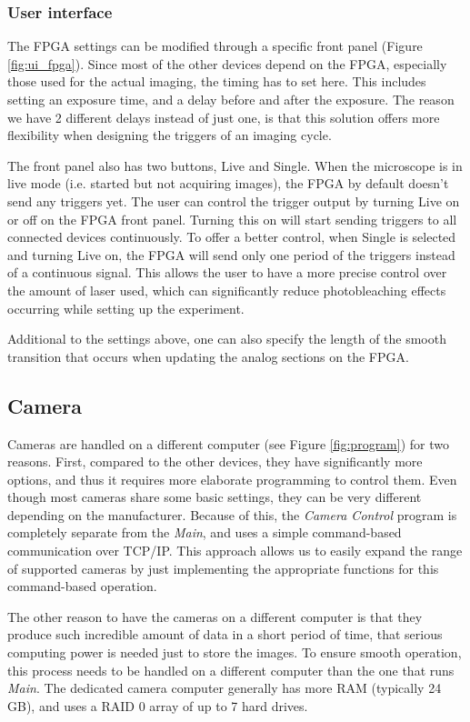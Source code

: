 \documentclass{tdk_style}
\begin{document}
\subsubsection{User interface}
The FPGA settings can be modified through a specific front panel (Figure \ref{fig:ui_fpga}). Since most of the other devices depend on the FPGA, especially those used for the actual imaging, the timing has to set here. This includes setting an exposure time, and a delay before and after the exposure. The reason we have 2 different delays instead of just one, is that this solution offers more flexibility when designing the triggers of an imaging cycle.

The front panel also has two buttons, Live and Single. When the microscope is in live mode (i.e. started but not acquiring images), the FPGA by default doesn't send any triggers yet. The user can control the trigger output by turning Live on or off on the FPGA front panel. Turning this on will start sending triggers to all connected devices continuously. To offer a better control, when Single is selected and turning Live on, the FPGA will send only one period of the triggers instead of a continuous signal. This allows the user to have a more precise control over the amount of laser used, which can significantly reduce photobleaching effects occurring while setting up the experiment.

Additional to the settings above, one can also specify the length of the smooth transition that occurs when updating the analog sections on the FPGA.



\subsection{Camera}
Cameras are handled on a different computer (see Figure \ref{fig:program}) for two reasons. First, compared to the other devices, they have significantly more options, and thus it requires more elaborate programming to control them. Even though most cameras share some basic settings, they can be very different depending on the manufacturer. Because of this, the \emph{Camera Control} program is completely separate from the \emph{Main}, and uses a simple command-based communication over TCP/IP. This approach allows us to easily expand the range of supported cameras by just implementing the appropriate functions for this command-based operation.

The other reason to have the cameras on a different computer is that they produce such incredible amount of data in a short period of time, that serious computing power is needed just to store the images. To ensure smooth operation, this process needs to be handled on a different computer than the one that runs \emph{Main}. The dedicated camera computer generally has more RAM (typically 24 GB), and uses a RAID 0 array of up to 7 hard drives.
\end{document}
